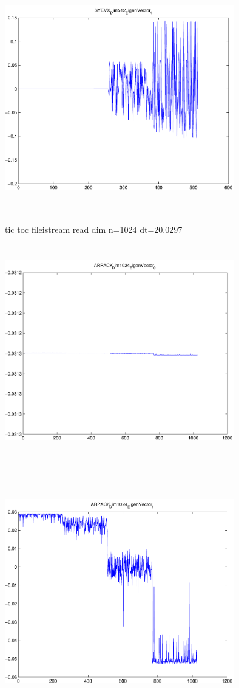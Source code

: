 \documentclass[9pt]{article}
\theoremstyle{plain}
\theoremstyle{definition}
\theoremstyle{remark}
\numberwithin{equation}{section}
\begin{document}
\includegraphics[width=10.0cm,height=10.0cm]{SYEVX_Dim512_EigenVector_4.pdf}

tic toc fileistream read dim n=1024 dt=20.0297
\includegraphics[width=10.0cm,height=10.0cm]{ARPACK_Dim1024_EigenVector_0.pdf}

\includegraphics[width=10.0cm,height=10.0cm]{ARPACK_Dim1024_EigenVector_1.pdf}
\end{document}
